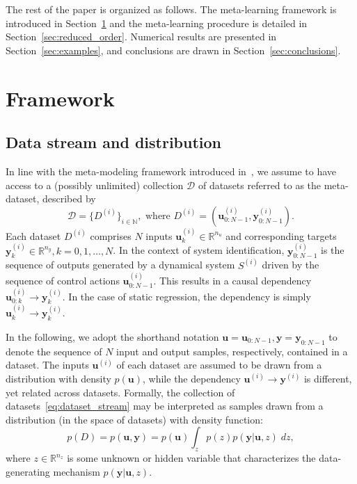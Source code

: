 \documentclass{article}
\newcommand{\ii}{{(i)}}
\newcommand{\seq}[1]{{\mathbf{#1}}}
\newcommand{\R}{\mathbb{R}}
\newcommand{\latent}{z}
\newcommand{\DD}{\mathcal{D}}
\newcommand{\N}{\mathbb{N}}
\begin{document}
The rest of the paper is organized as follows. The meta-learning framework is introduced in Section~\ref{sec:framework} and the meta-learning procedure is detailed in Section~\ref{sec:reduced_order}. Numerical results are presented in Section~\ref{sec:examples}, and conclusions are drawn in Section~\ref{sec:conclusions}.

\section{Framework}
\label{sec:framework}
\subsection{Data stream and distribution}
In line with the meta-modeling framework introduced in~\cite{forgione2023system}, we assume to have access to a (possibly unlimited) collection $\DD$ of datasets referred to as the meta-dataset, described by 
\begin{equation}  
\label{eq:dataset_stream}
\DD=\{D^\ii\}_{i\in\N}, \text{ where } D^\ii = (\seq u_{0:N-1}^\ii, \seq y_{0:N-1}^\ii).%
\end{equation}
Each dataset $D^\ii$ comprises $N$
inputs $\seq u^\ii_k \in \R^{n_u}$
and corresponding targets $\seq y^\ii_k \in \R^{n_y}, k=0,1,\dots,N$.
In the context of system identification, $\seq y^\ii_{0:N-1}$ is the sequence of outputs generated by a dynamical system $S^\ii$ driven by the sequence of control actions $\seq u^\ii_{0:N-1}$. This results in a causal  dependency $\seq u_{0:k}^\ii \rightarrow \seq y_k^\ii$. In the case of static regression, the dependency is simply $\seq u_k^\ii \rightarrow \seq y_k^\ii$.

In the following, we adopt the shorthand notation $\seq u=\seq u_{0:N-1}, \seq y = \seq y_{0:N-1}$ to denote the sequence of $N$ input and output samples, respectively, contained in a dataset.
The inputs $\seq u^\ii$ of each dataset are assumed to be drawn from a distribution with density $p(\seq u)$, while the dependency 
$\seq u^\ii \rightarrow \seq y^\ii$
is different, yet related across datasets.
Formally, the collection of datasets~\eqref{eq:dataset_stream} may be interpreted as samples drawn from a distribution (in the space of datasets) with density function:
\begin{equation}
\label{eq:dataset_distribution}
p(D) = p(\seq{u}, \seq{y}) = p(\seq{u}) 
\int_\latent p(\latent)  
p(\seq{y} | \seq{u}, \latent) \; d\latent,
\end{equation}
where $\latent \in \R^{n_\latent}$ is some unknown or hidden variable that characterizes the data-generating mechanism $p(\seq{y} | \seq{u}, \latent)$.
\end{document}
